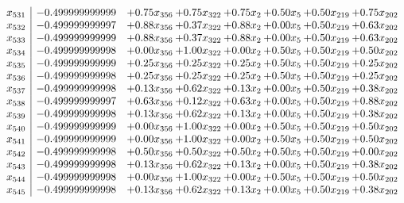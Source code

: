 \documentclass[8pt]{article}
\begin{document}
\[\begin{array}{c| c c@{\hskip 2pt} c@{\hskip 2pt} c@{\hskip 2pt} c@{\hskip 2pt} c@{\hskip 2pt} c@{\hskip 2pt} }
 x_{531}   &  -0.499999999999 & +  0.75 x_{356} & +  0.75 x_{322} & +  0.75 x_{2} & +  0.50 x_{5} & +  0.50 x_{219} & +  0.75 x_{202}\\
 x_{532}   &  -0.499999999997 & +  0.88 x_{356} & +  0.37 x_{322} & +  0.88 x_{2} & +  0.00 x_{5} & +  0.50 x_{219} & +  0.63 x_{202}\\
 x_{533}   &  -0.499999999999 & +  0.88 x_{356} & +  0.37 x_{322} & +  0.88 x_{2} & +  0.00 x_{5} & +  0.50 x_{219} & +  0.63 x_{202}\\
 x_{534}   &  -0.499999999998 & +  0.00 x_{356} & +  1.00 x_{322} & +  0.00 x_{2} & +  0.50 x_{5} & +  0.50 x_{219} & +  0.50 x_{202}\\
 x_{535}   &  -0.499999999999 & +  0.25 x_{356} & +  0.25 x_{322} & +  0.25 x_{2} & +  0.50 x_{5} & +  0.50 x_{219} & +  0.25 x_{202}\\
 x_{536}   &  -0.499999999998 & +  0.25 x_{356} & +  0.25 x_{322} & +  0.25 x_{2} & +  0.50 x_{5} & +  0.50 x_{219} & +  0.25 x_{202}\\
 x_{537}   &  -0.499999999998 & +  0.13 x_{356} & +  0.62 x_{322} & +  0.13 x_{2} & +  0.00 x_{5} & +  0.50 x_{219} & +  0.38 x_{202}\\
 x_{538}   &  -0.499999999997 & +  0.63 x_{356} & +  0.12 x_{322} & +  0.63 x_{2} & +  0.00 x_{5} & +  0.50 x_{219} & +  0.88 x_{202}\\
 x_{539}   &  -0.499999999998 & +  0.13 x_{356} & +  0.62 x_{322} & +  0.13 x_{2} & +  0.00 x_{5} & +  0.50 x_{219} & +  0.38 x_{202}\\
 x_{540}   &  -0.499999999999 & +  0.00 x_{356} & +  1.00 x_{322} & +  0.00 x_{2} & +  0.50 x_{5} & +  0.50 x_{219} & +  0.50 x_{202}\\
 x_{541}   &  -0.499999999999 & +  0.00 x_{356} & +  1.00 x_{322} & +  0.00 x_{2} & +  0.50 x_{5} & +  0.50 x_{219} & +  0.50 x_{202}\\
 x_{542}   &  -0.499999999998 & +  0.50 x_{356} & +  0.50 x_{322} & +  0.50 x_{2} & +  0.50 x_{5} & +  0.50 x_{219} & +  0.00 x_{202}\\
 x_{543}   &  -0.499999999998 & +  0.13 x_{356} & +  0.62 x_{322} & +  0.13 x_{2} & +  0.00 x_{5} & +  0.50 x_{219} & +  0.38 x_{202}\\
 x_{544}   &  -0.499999999998 & +  0.00 x_{356} & +  1.00 x_{322} & +  0.00 x_{2} & +  0.50 x_{5} & +  0.50 x_{219} & +  0.50 x_{202}\\
 x_{545}   &  -0.499999999998 & +  0.13 x_{356} & +  0.62 x_{322} & +  0.13 x_{2} & +  0.00 x_{5} & +  0.50 x_{219} & +  0.38 x_{202}\\

\end{array}\]
\end{document}
